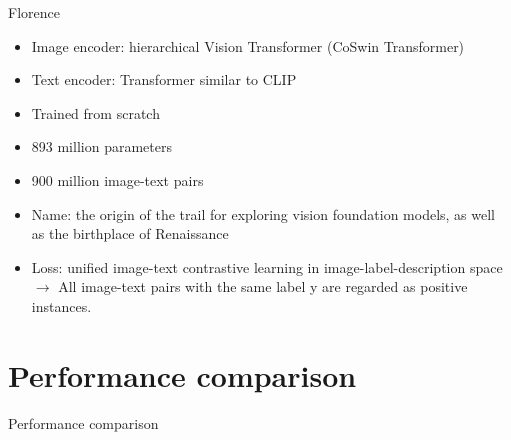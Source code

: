 \documentclass[xcolor=dvipsnames]{beamer}
\begin{document}
\begin{frame}{Florence \parencite{yuan2021florence}}
  \begin{itemize}
    \item Image encoder: hierarchical Vision Transformer (CoSwin Transformer)
    \item Text encoder: Transformer similar to CLIP
    \item Trained from scratch
    \item 893 million parameters \parencite{alford2021alignparams}
    \item 900 million image-text pairs
    \item Name: the origin of the trail for exploring vision foundation models, as well as the birthplace of Renaissance
    \item Loss: unified image-text contrastive learning in image-label-description space $\rightarrow$ All image-text pairs with the same label y are regarded as positive instances.
  \end{itemize}
\end{frame}


\section{Performance comparison}
\begin{frame}{Performance comparison}
  \begin{table}[ht]
    \centering
    \caption{Top-1 Accuracy of zero-shot transfer of ALIGN to image classification on ImageNet and its variants.}
  \end{table}
\end{frame}
\end{document}
